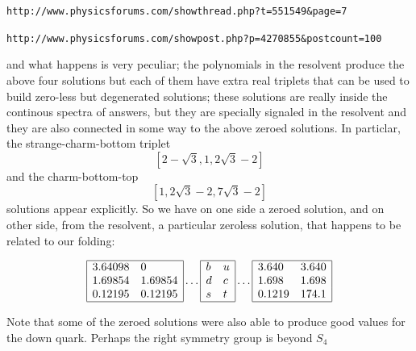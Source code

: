 \documentclass{article}
\begin{document}
 {\tt http://www.physicsforums.com/showthread.php?t=551549\&page=7}
 
 {\tt http://www.physicsforums.com/showpost.php?p=4270855\&postcount=100}
 
 and what happens is very peculiar; the polynomials in the resolvent
 produce the above four solutions but each of them
 have extra real triplets that can be used to build zero-less but degenerated
 solutions; these solutions are really inside the continous spectra
 of answers, but they are specially signaled in the resolvent and they
 are also connected in some way to the above zeroed solutions. In
 particlar, the strange-charm-bottom triplet
 $$
[2-\sqrt 3,1,2\sqrt 3 -2]   
$$
and the charm-bottom-top
$$
[1, 2\sqrt 3-2,7\sqrt 3-2] 
$$
solutions appear explicitly. So we have on one side a zeroed solution, and
on other side, from the resolvent, a particular zeroless solution, that happens
to be related to our folding:

$$
\begin{array}{|ll|}
\hline
 3.64098 & 0 \\
 1.69854 & 1.69854 \\
 0.12195 & 0.12195 \\
\hline
\end{array}
\dots
\begin{array}{|ll|}
\hline
 b  & u \\
 d  & c \\
 s  & t \\
\hline
\end{array} 
\dots
\begin{array}{|ll|}
\hline
 3.640 & 3.640 \\
 1.698 & 1.698 \\
 0.1219 & 174.1 \\
\hline
\end{array}
$$
 
Note that some of the zeroed solutions were also able to produce good values for the down
quark. Perhaps the right symmetry group is beyond $S_4$
\end{document}
